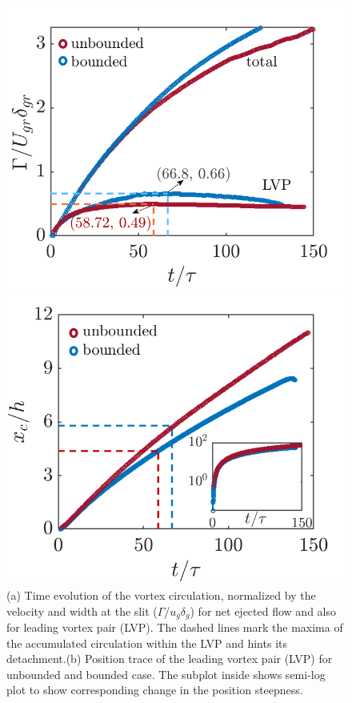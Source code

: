 \documentclass[final,3p,times,authoryear]{elsarticle}
\begin{document}
\begin{figure}[h]
	\centering
	\begin{minipage}[c]{0.46\linewidth}
		\centering
		\includegraphics[width=1\linewidth] {Figures/Circ_S1.png} 
	\end{minipage}
	\begin{minipage}[c]{0.495\linewidth}
		\centering
		\includegraphics[width=1\linewidth] {Figures/velocity.png} 
	\end{minipage}
	\caption{(a) Time evolution of the vortex circulation, normalized by the velocity and width at the slit ($\Gamma$/$u_g\delta_g$) for net ejected flow and also for leading vortex pair (LVP). The dashed lines mark the maxima of the accumulated circulation within the LVP and hints its detachment.(b) Position trace of the leading vortex pair (LVP) for unbounded and bounded case. The subplot inside shows semi-log plot to show corresponding change in the position steepness.}
	\label{fig:Circ_S1_vs_T}
\end{figure}
\end{document}
